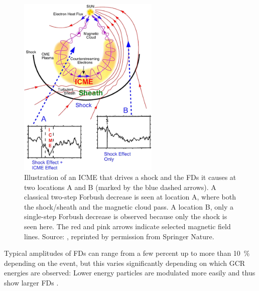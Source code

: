 \begin{figure}
	\centering
	\includegraphics[width=0.6\textwidth]{images/richardson_cane_2011_icme.png}
	\caption[Illustration of \acsp{ICME} and \aclp{FD}]{Illustration of an \ac{ICME} that drives a shock and the \acp{FD} it causes at two locations A and B (marked by the blue dashed arrows). A classical two-step Forbush decrease is seen at location A, where both the shock/sheath and the magnetic cloud pass. A location B, only a single-step Forbush decrease is observed because only the shock is seen here. The red and pink arrows indicate selected magnetic field lines. Source: \citet[Figure 1]{Richardson-Cane-2011}, reprinted by permission from Springer Nature.}
	\label{fig:richardsoncane-cme}
\end{figure}
Typical amplitudes of \acp{FD} can range from a few percent up to more than \SI{10}{\percent} depending on the event, but this varies significantly depending on which \ac{GCR} energies are observed: Lower energy particles are modulated more easily and thus show larger \acp{FD} \citep[e.g.][]{Lockwood1971,Lockwood1991}.

